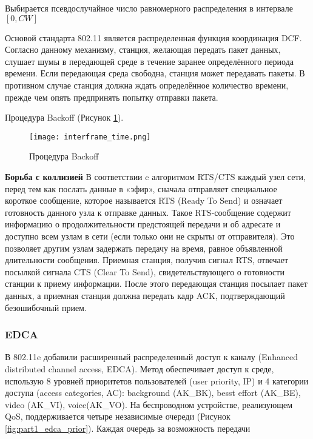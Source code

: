 

 Выбирается псевдослучайное число равномерного распределения в интервале $[0, CW]$




Основой стандарта 802.11 является распределенная функция координация DCF. Согласно данному механизму, станция, желающая передать пакет данных, слушает шумы в передающей среде в течение заранее определённого периода времени. Если передающая среда свободна, станция может передавать пакеты. В противном случае станция должна ждать определённое количество времени, прежде чем опять предпринять попытку отправки пакета.

Процедура Backoff (Рисунок \cref{fig:part1_interframe_time}).

\begin{figure}[h!]
  \centering
   \texttt{[image: interframe\_time.png]}
\caption{Процедура Backoff}
\label{fig:part1_interframe_time}
\end{figure}
 
  
\textbf{Борьба с коллизией}
В соответствии c алгоритмом RTS/CTS каждый узел сети, перед тем как послать данные в «эфир», сначала отправляет специальное короткое сообщение, которое называется RTS (Ready To Send) и означает готовность данного узла к отправке данных. Такое RTS-сообщение содержит информацию о продолжительности предстоящей передачи и об адресате и доступно всем узлам в сети (если только они не скрыты от отправителя). Это позволяет другим узлам задержать передачу на время, равное объявленной длительности сообщения. Приемная станция, получив сигнал RTS, отвечает посылкой сигнала CTS (Clear To Send), свидетельствующего о готовности станции к приему информации. После этого передающая станция посылает пакет данных, а приемная станция должна передать кадр ACK, подтверждающий безошибочный прием. 

\subsubsection{EDCA}

В 802.11e добавили расширенный распределенный доступ к каналу (Enhanced distributed channel access, EDCA). 
Метод обеспечивает доступ к среде, использую 8 уровней приоритетов пользователей (user priority, IP) и 4 категории доступа (access categories, AC): background (AK\_BK), besst effort (AK\_BE), video (AK\_VI), voice(AK\_VO). На беспроводном устройстве, реализующем QoS, поддерживается четыре независимые очереди (Рисунок \cref{fig:part1_edca_prior}). Каждая очередь за возможность передачи


